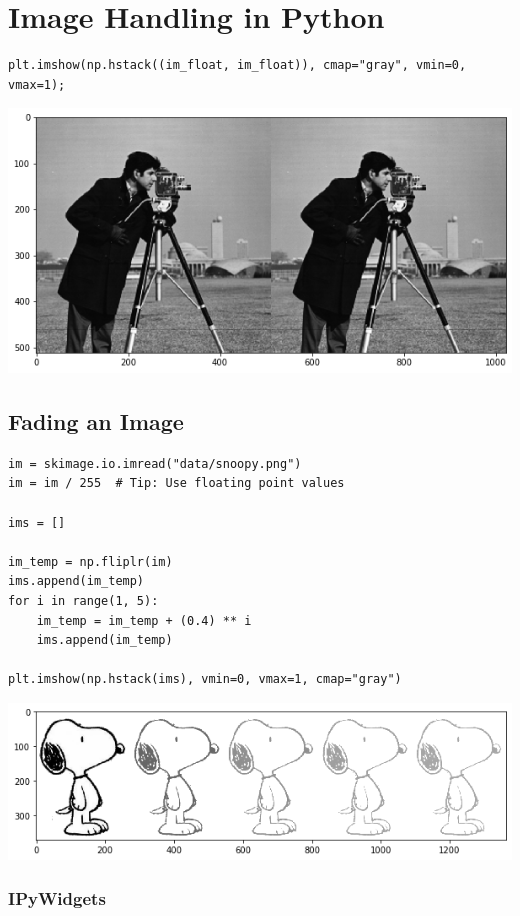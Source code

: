 
\section{Image Handling in Python}

\begin{verbatim}
plt.imshow(np.hstack((im_float, im_float)), cmap="gray", vmin=0, vmax=1);
\end{verbatim}

\begin{center}
    \includegraphics[width=0.7\linewidth]{img/hstack_image}
\end{center}

\subsection{Fading an Image}

\begin{verbatim}
im = skimage.io.imread("data/snoopy.png")
im = im / 255  # Tip: Use floating point values

ims = []

im_temp = np.fliplr(im)
ims.append(im_temp)
for i in range(1, 5):
    im_temp = im_temp + (0.4) ** i
    ims.append(im_temp)

plt.imshow(np.hstack(ims), vmin=0, vmax=1, cmap="gray")
\end{verbatim}

\begin{center}
    \includegraphics[width=0.7\linewidth]{img/snoopy_fade}
\end{center}

\subsubsection{IPyWidgets}

